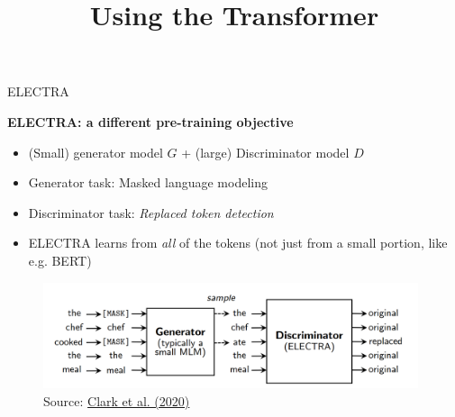 



\newcommand{\titlefigure}{figure/sesamestreet.jpeg}
\newcommand{\learninggoals}{
\item Replaced Token Detection task
\item Interplay of Generator and Discriminator}

\title{Using the Transformer}
\date{}




\begin{frame}{ELECTRA \href{https://arxiv.org/pdf/2003.10555.pdf}{}}

	\textbf{ELECTRA: a different pre-training objective}

	\begin{itemize}
		\item (Small) generator model $G$ + (large) Discriminator model $D$
		\item Generator task: Masked language modeling
		\item Discriminator task: \textit{Replaced token detection}
		\item ELECTRA learns from \textit{all} of the tokens (not just from a small portion, like e.g. BERT)
	\end{itemize}
	
	\begin{figure}
		\centering
		\includegraphics[width = 11cm]{figure/electra.png}\\ 
		\footnotesize{Source:} \href{https://arxiv.org/pdf/2003.10555.pdf}{\footnotesize Clark et al. (2020)}
	\end{figure}
\end{frame}


